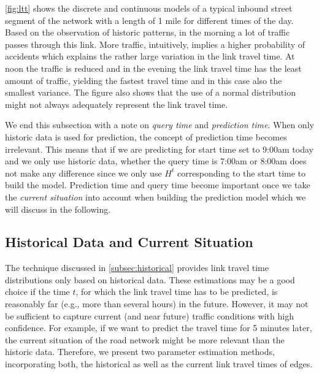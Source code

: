 



\cref{fig:ltt} shows the discrete and continuous models of a typical inbound street segment of the network with a length of 1 mile for different times of the day. Based on the observation of historic patterns, in the morning a lot of traffic passes through this link. More traffic, intuitively, implies a higher probability of accidents which explains the rather large variation in the link travel time. At noon the traffic is
reduced and in the evening the link travel time has the least amount of traffic, yielding the fastest travel time and in this case also the smallest variance. The figure also shows that the use of a normal distribution might not always adequately represent the link travel time.

We end this subsection with a note on \textit{query time} and \textit{prediction time}. When only historic data is used for prediction, the concept of prediction time becomes irrelevant. This means that if we are predicting for start time set to 9:00am today and we only use historic data, whether the query time is 7:00am or 8:00am does not make any difference since we only use $H^t$ corresponding to the start time to build the model. Prediction time and query time become important once we take the \textit{current situation} into account when building the prediction model which we will discuss in the following. 

\subsection{Historical Data and Current Situation}
The technique discussed in \cref{subsec:historical} provides link travel time
distributions only based on historical data. These estimations may be a good choice if the time $t$, for which the link travel time has to be predicted, is reasonably far (e.g., more than several hours) in the future. However, it may not be sufficient to capture current (and near future) traffic conditions with high confidence. For example, if we want to predict the travel time for 5 minutes later, the current situation of the road network might be more relevant than the historic data. Therefore, we present two parameter estimation methods, incorporating both, the historical as well as the current link travel times of edges.

